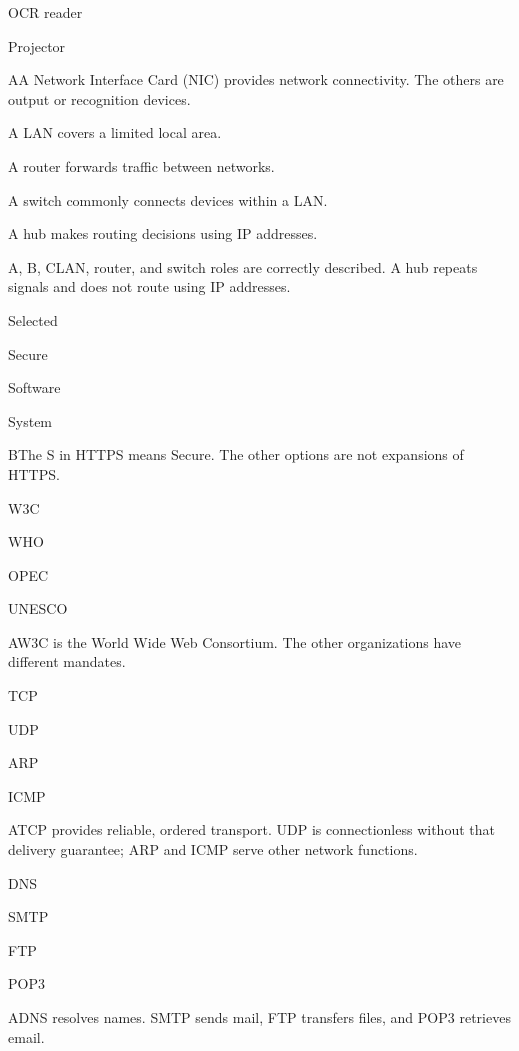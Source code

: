 \begin{enumerate}[label=\textbf{Q\arabic*.}, leftmargin=*]
{   \item OCR reader
   \item Projector}
  {A}{A Network Interface Card (NIC) provides network connectivity. The others are output or recognition devices.}
  {\item A LAN covers a limited local area.
   \item A router forwards traffic between networks.
   \item A switch commonly connects devices within a LAN.
   \item A hub makes routing decisions using IP addresses.}
  {A, B, C}{LAN, router, and switch roles are correctly described. A hub repeats signals and does not route using IP addresses.}
\fi
\ifnum{}
  {\item Selected
   \item Secure
   \item Software
   \item System}
  {B}{The S in HTTPS means Secure. The other options are not expansions of HTTPS.}
  {\item W3C
   \item WHO
   \item OPEC
   \item UNESCO}
  {A}{W3C is the World Wide Web Consortium. The other organizations have different mandates.}
  {\item TCP
   \item UDP
   \item ARP
   \item ICMP}
  {A}{TCP provides reliable, ordered transport. UDP is connectionless without that delivery guarantee; ARP and ICMP serve other network functions.}
  {\item DNS
   \item SMTP
   \item FTP
   \item POP3}
  {A}{DNS resolves names. SMTP sends mail, FTP transfers files, and POP3 retrieves email.}

\end{enumerate}
